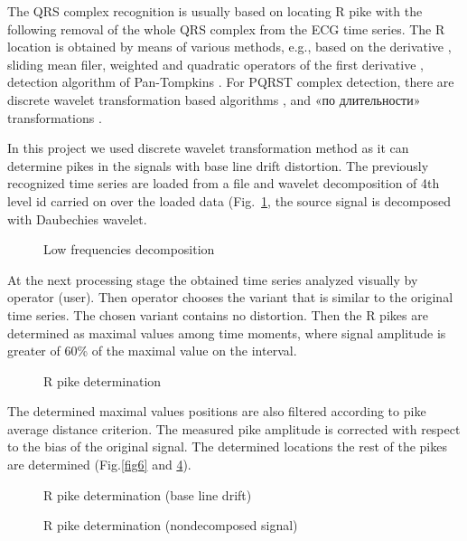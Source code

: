 \documentclass[runningheads]{AIIT}
\newcommand{\nnn}[2][rcolor]{\noindent%
\textcolor{eclr}{}\textcolor{#1}{#2}\textcolor{eclr}{}}
\begin{document}
The QRS complex recognition is usually based on locating R pike with the following removal of the whole QRS complex from the ECG time series.  The R location is obtained by means of various methods, e.g., based on the derivative \cite{2}, sliding mean filer, weighted and quadratic operators of the first derivative \cite{3}, detection algorithm of Pan-Tompkins \cite{4}.  For PQRST complex detection, there are discrete wavelet transformation based algorithms \cite{5, 6}, and \nnn{«по длительности»} transformations \cite{7}.

In this project we used discrete wavelet transformation method as it can determine pikes in the signals with base line drift distortion.  The previously recognized time series are loaded from a file and wavelet decomposition of \nnn{4th level} id carried on over the loaded data (Fig.~\ref{fig:decomp}, the source signal is decomposed with Daubechies wavelet.

\begin{figure}[htb]
  \centering

  \caption{Low frequencies decomposition}
  \label{fig:decomp}
\end{figure}

At the next processing stage the obtained time series analyzed visually by operator (user).  Then operator chooses the variant that is similar to the original time series.  The chosen variant contains no distortion.  Then the R pikes are determined as maximal values among time moments, where signal amplitude is greater of 60\% of the maximal value on the interval.

\begin{figure}[htb]
  \centering

  \caption{R pike determination}
  \label{fig:determ-R}
\end{figure}
The determined maximal values positions are also filtered according to pike average distance criterion.  The measured pike amplitude is corrected with respect to the bias of the original signal.  The determined locations the rest of the pikes are determined (Fig.\ref{fig6} and \ref{fig:fig7}).

\begin{figure}[htb]
  \centering

  \caption{R pike determination (base line drift)}
  \label{fig:fig6}
\end{figure}

\begin{figure}[htb]
  \centering

  \caption{R pike determination (nondecomposed signal)}
  \label{fig:fig7}
\end{figure}
\end{document}
